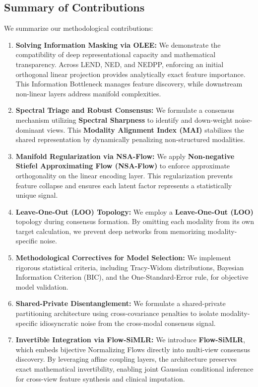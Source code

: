 \documentclass[
  letterpaper,
]{report}
\providecommand{\tightlist}{%
  \setlength{\itemsep}{0pt}\setlength{\parskip}{0pt}}
\begin{document}
\subsection{Summary of Contributions}\label{summary-of-contributions}

We summarize our methodological contributions:

\begin{enumerate}
\def\labelenumi{\arabic{enumi}.}
\tightlist
\item
  \textbf{Solving Information Masking via OLEE:} We demonstrate the
  compatibility of deep representational capacity and mathematical
  transparency. Across LEND, NED, and NEDPP, enforcing an initial
  orthogonal linear projection provides analytically exact feature
  importance. This Information Bottleneck manages feature discovery,
  while downstream non-linear layers address manifold complexities.
\item
  \textbf{Spectral Triage and Robust Consensus:} We formulate a
  consensus mechanism utilizing \textbf{Spectral Sharpness} to identify
  and down-weight noise-dominant views. This \textbf{Modality Alignment
  Index (MAI)} stabilizes the shared representation by dynamically
  penalizing non-structured modalities.
\item
  \textbf{Manifold Regularization via NSA-Flow:} We apply
  \textbf{Non-negative Stiefel Approximating Flow (NSA-Flow)} to enforce
  approximate orthogonality on the linear encoding layer. This
  regularization prevents feature collapse and ensures each latent
  factor represents a statistically unique signal.
\item
  \textbf{Leave-One-Out (LOO) Topology:} We employ a
  \textbf{Leave-One-Out (LOO)} topology during consensus formation. By
  omitting each modality from its own target calculation, we prevent
  deep networks from memorizing modality-specific noise.
\item
  \textbf{Methodological Correctives for Model Selection:} We implement
  rigorous statistical criteria, including Tracy-Widom distributions,
  Bayesian Information Criterion (BIC), and the One-Standard-Error rule,
  for objective model validation.
\item
  \textbf{Shared-Private Disentanglement:} We formulate a shared-private
  partitioning architecture using cross-covariance penalties to isolate
  modality-specific idiosyncratic noise from the cross-modal consensus
  signal.
\item
  \textbf{Invertible Integration via Flow-SiMLR:} We introduce
  \textbf{Flow-SiMLR}, which embeds bijective Normalizing Flows directly
  into multi-view consensus discovery. By leveraging affine coupling
  layers, the architecture preserves exact mathematical invertibility,
  enabling joint Gaussian conditional inference for cross-view feature
  synthesis and clinical imputation.
\end{enumerate}
\end{document}
